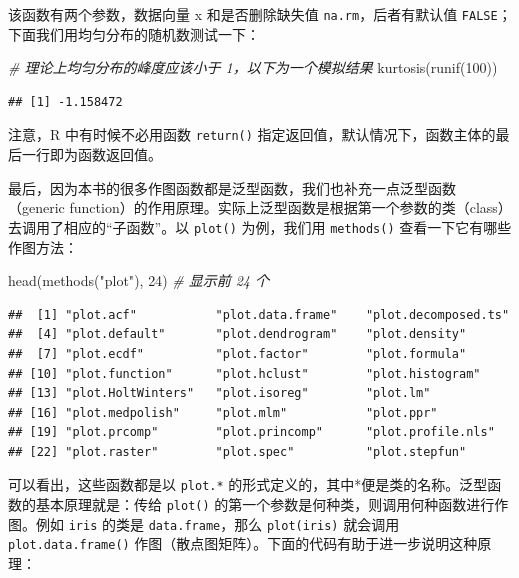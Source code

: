 \documentclass[
  b5paper,
  UTF8,twoside]{book}
\newenvironment{Shaded}{\begin{snugshade}}{\end{snugshade}}
\newcommand{\CommentTok}[1]{\textcolor[rgb]{0.56,0.35,0.01}{\textit{#1}}}
\newcommand{\DecValTok}[1]{\textcolor[rgb]{0.00,0.00,0.81}{#1}}
\newcommand{\FunctionTok}[1]{\textcolor[rgb]{0.00,0.00,0.00}{#1}}
\newcommand{\NormalTok}[1]{#1}
\newcommand{\StringTok}[1]{\textcolor[rgb]{0.31,0.60,0.02}{#1}}
\begin{document}
该函数有两个参数，数据向量 x 和是否删除缺失值 \texttt{na.rm}，后者有默认值 \texttt{FALSE}；下面我们用均匀分布的随机数测试一下：

\begin{Shaded}
\begin{Highlighting}[]
\CommentTok{\# 理论上均匀分布的峰度应该小于 1，以下为一个模拟结果}
\FunctionTok{kurtosis}\NormalTok{(}\FunctionTok{runif}\NormalTok{(}\DecValTok{100}\NormalTok{))}
\end{Highlighting}
\end{Shaded}

\begin{verbatim}
## [1] -1.158472
\end{verbatim}

注意，R 中有时候不必用函数 \texttt{return()} 指定返回值，默认情况下，函数主体的最后一行即为函数返回值。

最后，因为本书的很多作图函数都是泛型函数，我们也补充一点泛型函数 （generic function）的作用原理。实际上泛型函数是根据第一个参数的类（class）去调用了相应的``子函数''。以 \texttt{plot()} 为例，我们用 \texttt{methods()} 查看一下它有哪些作图方法：

\begin{Shaded}
\begin{Highlighting}[]
\FunctionTok{head}\NormalTok{(}\FunctionTok{methods}\NormalTok{(}\StringTok{"plot"}\NormalTok{), }\DecValTok{24}\NormalTok{) }\CommentTok{\# 显示前 24 个}
\end{Highlighting}
\end{Shaded}

\begin{verbatim}
##  [1] "plot.acf"           "plot.data.frame"    "plot.decomposed.ts"
##  [4] "plot.default"       "plot.dendrogram"    "plot.density"      
##  [7] "plot.ecdf"          "plot.factor"        "plot.formula"      
## [10] "plot.function"      "plot.hclust"        "plot.histogram"    
## [13] "plot.HoltWinters"   "plot.isoreg"        "plot.lm"           
## [16] "plot.medpolish"     "plot.mlm"           "plot.ppr"          
## [19] "plot.prcomp"        "plot.princomp"      "plot.profile.nls"  
## [22] "plot.raster"        "plot.spec"          "plot.stepfun"
\end{verbatim}

可以看出，这些函数都是以 \texttt{plot.*} 的形式定义的，其中*便是类的名称。泛型函数的基本原理就是：传给 \texttt{plot()} 的第一个参数是何种类，则调用何种函数进行作图。例如 \texttt{iris} 的类是 \texttt{data.frame}，那么 \texttt{plot(iris)} 就会调用 \texttt{plot.data.frame()} 作图（散点图矩阵）。下面的代码有助于进一步说明这种原理：
\end{document}
